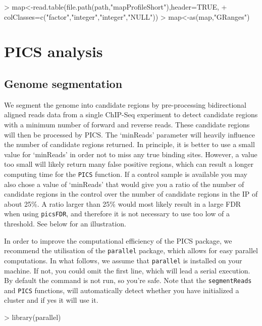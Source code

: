 \documentclass[a4paper]{article}
\begin{document}
\begin{Schunk}
\begin{Sinput}
> map<-read.table(file.path(path,"mapProfileShort"),header=TRUE,
+ colClasses=c("factor","integer","integer","NULL"))
> map<-as(map,"GRanges")
\end{Sinput}
\end{Schunk}


\section{PICS analysis}

\subsection{Genome segmentation}
We segment the genome into candidate regions by pre-processing bidirectional aligned reads data from a single ChIP-Seq experiment to detect candidate regions with a minimum number of forward and reverse reads. These candidate regions will then be processed by PICS. The `minReads' parameter will heavily influence the number of candidate regions returned. In principle, it is better to use a small value for `minReads' in order not to miss any true binding sites. However, a value too small will likely return many false positive regions, which can result a longer computing time for the \texttt{PICS} function.  If a control sample is available you may also chose a value of `minReads' that would give you a ratio of the number of candidate regions in the control over the number of candidate regions in the IP of about 25\%. A ratio larger than 25\% would most likely result in a large FDR when using \texttt{picsFDR}, and therefore it is not necessary to use too low of a threshold. See below for an illustration.  \newline

In order to improve the computational efficiency of the PICS package, we recommend the utilisation of the \texttt{parallel} package, which allows for easy parallel computations. In what follows, we assume that \texttt{parallel} is installed on your machine. If not, you could omit the first line, which will lead a serial execution. By default the command is not run, so you're safe. Note that the \texttt{segmentReads} and \texttt{PICS} functions, will automatically detect whether you have initialized a cluster and if yes it will use it. 

\begin{Schunk}
\begin{Sinput}
> library(parallel)
\end{Sinput}
\end{Schunk}
\end{document}
